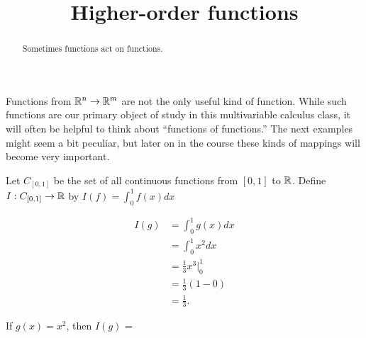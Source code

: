 \documentclass{ximera}
\title{Higher-order functions}
\begin{document}
\begin{abstract}
  Sometimes functions act on functions.
\end{abstract}
\maketitle


Functions from $\mathbb R^n \to \mathbb R^m$ are not the only useful kind of
function.  While such functions are our primary object of study in
this multivariable calculus class, it will often be helpful to think
about ``functions of functions.''  The next examples might seem a bit
peculiar, but later on in the course these kinds of mappings will
become very important.

\begin{question}
  Let $C_{[0,1]}$ be the set of all continuous functions from $[0,1]$ to $\mathbb R$.  Define $I:C_{[0,1]} \to \mathbb R$ by $I(f) = \displaystyle \int_0^1 f(x)dx$ 
  \begin{solution}
    \begin{hint}
      \begin{align*}
        I(g) &= \int_0^1 g(x)dx\\
        &= \int_0^1 x^2dx\\
        &= \frac{1}{3} x^3\big|_0^1\\
        &= \frac{1}{3}(1-0)\\
        &= \frac{1}{3}.
      \end{align*}
    \end{hint}
    
    If $g(x)  = x^2$, then $I(g)$ = 
  \end{solution}
\end{question}
\end{document}

